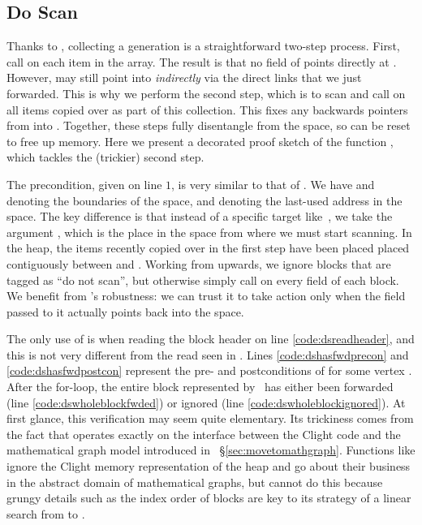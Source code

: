 \subsection{Do Scan}

Thanks to , collecting a generation is a straightforward 
two-step process.
First, call  on each item in the  array. 
The result is that no field of  points directly at . 
However,  may still point into  \emph{indirectly} 
via the direct links that we just forwarded.
This is why we perform the second step, which is to scan  and call 
 on all items copied over as part of this collection. This
fixes any backwards pointers from  into .
Together, these steps fully disentangle  from the 
 space, so  can be reset to free up memory. 
Here we present a decorated proof sketch of the function
, which tackles the (trickier) second step.


The precondition, given on line $1$, is very similar to that of 
. We have  and  denoting the boundaries
of the  space, and  denoting the last-used address
in the  space. The key difference is that instead of a specific
target like~, we take the argument , 
which is the place in the  space from where we must start scanning.
In the heap, the items recently copied over in the first step 
have been placed placed contiguously between  and . 
Working from  upwards, we ignore blocks that are tagged as 
``do not scan'', but otherwise simply call  on every field
of each block. We benefit from 's robustness: we can trust it to 
take action only when the field passed to it actually points back into the 
 space. 

The only use of  is when
reading the block header on line \ref{code:dsreadheader}, 
and this is not very different from the read seen in . 
Lines \ref{code:dshasfwdprecon} and \ref{code:dshasfwdpostcon} 
represent the pre- and postconditions of 
for some vertex . 
After the for-loop, the entire block represented by~ has either been
forwarded (line \ref{code:dswholeblockfwded}) or 
ignored (line \ref{code:dswholeblockignored}). 
At first glance, this verification may seem quite elementary. 
Its trickiness comes from the fact
that  operates exactly on the interface between the Clight code 
and the mathematical graph model introduced in ~\S\ref{sec:movetomathgraph}.
Functions like  ignore the Clight memory representation 
of the heap and go about their business in the abstract domain
of mathematical graphs, but  cannot do this because grungy 
details such as the index order of blocks are key to its strategy of a
linear search from  to .

